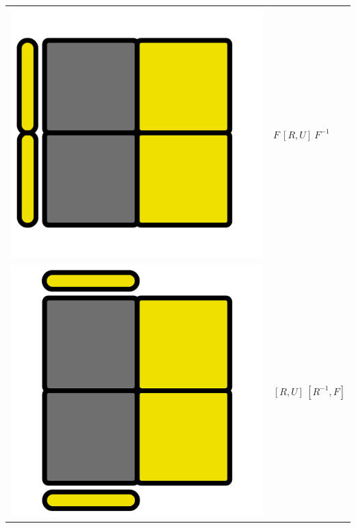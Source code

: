 \documentclass[12pt,a4paper, usenames, dvipsnames]{article}
\theoremstyle{mystyle}
\theoremstyle{definition}
\begin{document}
\begin{center}
\begin{tabular}{m{4cm} m{6cm}}
\includegraphics[scale=0.08]{TOPVIEW4.png} & $F \ [ R,U ] \ F^{-1}$ \\
\includegraphics[scale=0.08]{TOPVIEW5.png} & $[ R,U ] \ [R^{-1}, F]$ \\

\end{tabular}
\end{center}
\end{document}
